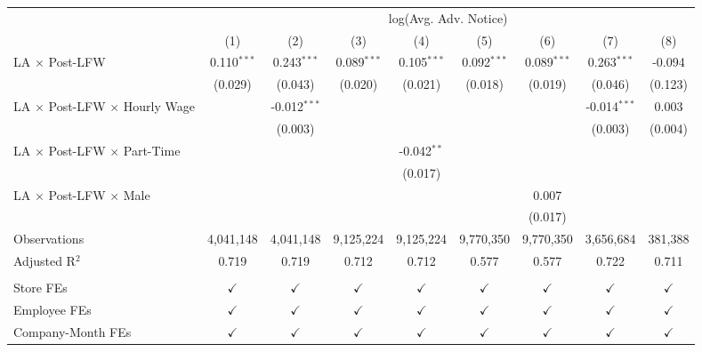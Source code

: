 
\begingroup
\centering
\scriptsize
\begin{tabular}{lcccccccc}
   \toprule
    & \multicolumn{8}{c}{log(Avg. Adv. Notice)}\\
                                               & (1)           & (2)            & (3)           & (4)           & (5)           & (6)           & (7)            & (8)\\  
   \midrule 
   LA $\times$ Post-LFW                        & 0.110$^{***}$ & 0.243$^{***}$  & 0.089$^{***}$ & 0.105$^{***}$ & 0.092$^{***}$ & 0.089$^{***}$ & 0.263$^{***}$  & -0.094\\   
                                               & (0.029)       & (0.043)        & (0.020)       & (0.021)       & (0.018)       & (0.019)       & (0.046)        & (0.123)\\   
   LA $\times$ Post-LFW $\times$ Hourly Wage   &               & -0.012$^{***}$ &               &               &               &               & -0.014$^{***}$ & 0.003\\   
                                               &               & (0.003)        &               &               &               &               & (0.003)        & (0.004)\\   
   LA $\times$ Post-LFW $\times$ Part-Time     &               &                &               & -0.042$^{**}$ &               &               &                &   \\   
                                               &               &                &               & (0.017)       &               &               &                &   \\   
   LA $\times$ Post-LFW $\times$ Male          &               &                &               &               &               & 0.007         &                &   \\   
                                               &               &                &               &               &               & (0.017)       &                &    
    \\
   Observations                                & 4,041,148     & 4,041,148      & 9,125,224     & 9,125,224     & 9,770,350     & 9,770,350     & 3,656,684      & 381,388\\  
   Adjusted R$^2$                              & 0.719         & 0.719          & 0.712         & 0.712         & 0.577         & 0.577         & 0.722          & 0.711\\  
    \\
   Store FEs                                   & $\checkmark$  & $\checkmark$   & $\checkmark$  & $\checkmark$  & $\checkmark$  & $\checkmark$  & $\checkmark$   & $\checkmark$\\   
   Employee FEs                                & $\checkmark$  & $\checkmark$   & $\checkmark$  & $\checkmark$  & $\checkmark$  & $\checkmark$  & $\checkmark$   & $\checkmark$\\   
   Company-Month FEs                           & $\checkmark$  & $\checkmark$   & $\checkmark$  & $\checkmark$  & $\checkmark$  & $\checkmark$  & $\checkmark$   & $\checkmark$\\   
   \bottomrule
\end{tabular}
\par\endgroup


